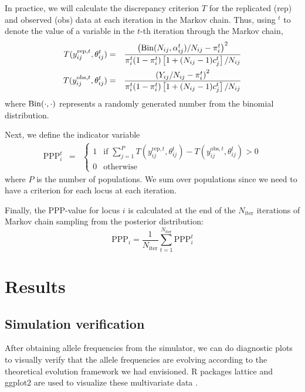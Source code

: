 \documentclass[a4paper,12pt]{article}
\begin{document}
In practice, we will calculate the discrepancy criterion $T$ for the
replicated (rep) and observed (obs) data at each iteration in the
Markov chain. Thus, using $^t$ to denote the value of a variable in
the $t$-th iteration through the Markov chain,
\begin{eqnarray*}
  T(y_{ij}^{\text{rep},t},\theta_{ij}^t) &=&
  \frac{\left(\operatorname{Bin}(N_{ij},\alpha_{ij}^t)/N_{ij} - \pi_i^t\right)^2}{
  \pi^t_i(1-\pi^t_i) \left[1+(N_{ij}-1)c^t_j\right]/N_{ij}}\\    
  T(y_{ij}^{\text{obs},t},\theta_{ij}^t) &=&
  \frac{\left(Y_{ij}/N_{ij} - \pi_i^t\right)^2}{
  \pi^t_i(1-\pi^t_i) \left[1+(N_{ij}-1)c^t_j\right]/N_{ij}}\\
\end{eqnarray*}
where $\operatorname{Bin}(\cdot,\cdot)$ represents a randomly generated number from
the binomial distribution.

Next, we define the indicator variable
\begin{eqnarray*}
\text{PPP}_i^t &=&
\begin{cases}
  1 & \text{if }\sum_{j=1}^P T(y_{ij}^{\text{rep},t},\theta_{ij}^t) 
                          - T(y_{ij}^{\text{obs},t},\theta_{ij}^t) > 0\\
  0 & \text{otherwise}
\end{cases}
\end{eqnarray*}
where $P$ is the number of populations. We sum over populations since
we need to have a criterion for each locus at each iteration.

Finally, the PPP-value for locus $i$ is calculated at the end of the
$N_{\text{iter}}$ iterations of Markov chain sampling from the
posterior distribution:
$$
\text{PPP}_i = \frac 1 {N_{\text{iter}}} 
\sum_{t=1}^{N_{\text{iter}}} \text{PPP}_{i}^t
$$

\section{Results}

\subsection{Simulation verification}

After obtaining allele frequencies from the simulator, we can do
diagnostic plots to visually verify that the allele frequencies are
evolving according to the theoretical evolution framework we had
envisioned. R packages lattice and ggplot2 are used to visualize these
multivariate data \cite{lattice,ggplot2}.
\end{document}
